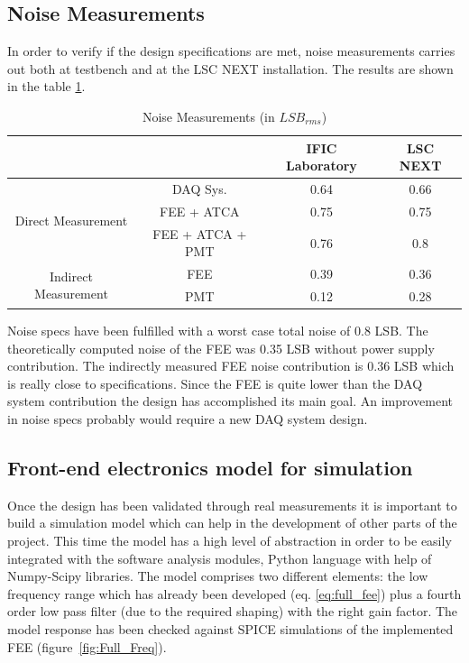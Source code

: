 \documentclass[a4paper, 10pt, oneside, twocolumn, 3p]{elsarticle}
\begin{document}
\subsection{Noise Measurements}
In order to verify if the design specifications are met, noise measurements carries out both at testbench and at the LSC NEXT installation. The results are shown in the table \ref{tab:noise}. 

\begin{table}[ht]
	\caption{Noise Measurements (in $LSB_{rms}$)}
	\label{tab:noise}	
	\begin{center}
		\begin{tabular}{ c c || c | c |}
			& & IFIC Laboratory & LSC NEXT \\
			\hline
			\multirow{3}{*}{Direct Measurement} & DAQ Sys. & 0.64 & 0.66\\
			& FEE + ATCA & 0.75 & 0.75\\
			& FEE + ATCA + PMT & 0.76 & 0.8\\
			\hline
			\multirow{2}{*}{Indirect Measurement} & FEE & 0.39 & 0.36\\
			& PMT & 0.12 & 0.28\\
		\end{tabular}
	\end{center}
\end{table}


Noise specs have been fulfilled with a worst case total noise of 0.8 LSB. The theoretically computed noise of the FEE was 0.35 LSB without power supply contribution. The indirectly measured FEE noise contribution is 0.36 LSB which is really close to specifications. Since the FEE is quite lower than the DAQ system contribution the design has accomplished its main goal. An improvement in noise specs probably would require a new DAQ system design.

\subsection{Front-end electronics model for simulation}
Once the design has been validated through real measurements it is important to build a simulation model which can help in the development of other parts of the project. This time the model has a high level of abstraction in order to be easily integrated with the software analysis modules, Python language with help of Numpy-Scipy libraries. The model comprises two different elements: the low frequency range which has already been developed (eq. \ref{eq:full_fee}) plus a fourth order low pass filter (due to the required shaping) with the right gain factor. The model response has been checked against SPICE simulations of the implemented FEE (figure~\ref{fig:Full_Freq}).
\end{document}
